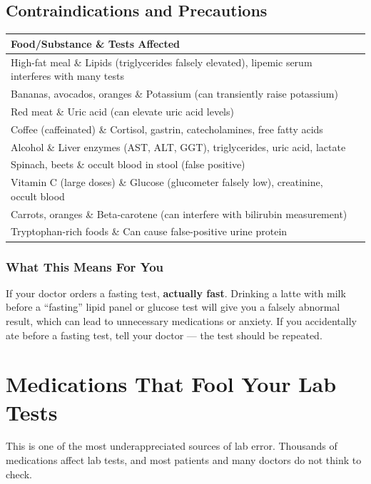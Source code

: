 \subsection{Contraindications and Precautions}

\begin{longtable}{@{}ll@{}}
\toprule
\textbf{Food/Substance} \& \textbf{Tests Affected} \\
\midrule
High-fat meal \& Lipids (triglycerides falsely elevated), lipemic serum interferes with many tests \\
Bananas, avocados, oranges \& Potassium (can transiently raise potassium) \\
Red meat \& Uric acid (can elevate uric acid levels) \\
Coffee (caffeinated) \& Cortisol, gastrin, catecholamines, free fatty acids \\
Alcohol \& Liver enzymes (AST, ALT, GGT), triglycerides, uric acid, lactate \\
Spinach, beets \& occult blood in stool (false positive) \\
Vitamin C (large doses) \& Glucose (glucometer falsely low), creatinine, occult blood \\
Carrots, oranges \& Beta-carotene (can interfere with bilirubin measurement) \\
Tryptophan-rich foods \& Can cause false-positive urine protein \\
\bottomrule
\end{longtable}

\subsubsection{What This Means For You}

If your doctor orders a fasting test, \textbf{actually fast}. Drinking a latte with milk before a ``fasting'' lipid panel or glucose test will give you a falsely abnormal result, which can lead to unnecessary medications or anxiety. If you accidentally ate before a fasting test, tell your doctor --- the test should be repeated.

\clearpage
\section{Medications That Fool Your Lab Tests}

This is one of the most underappreciated sources of lab error. Thousands of medications affect lab tests, and most patients and many doctors do not think to check.

